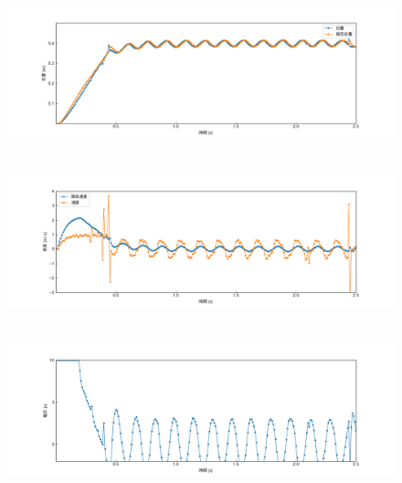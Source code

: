 \documentclass[12pt]{jsarticle}
\begin{document}
\begin{figure}[H]
  \begin{center}
    \includegraphics[clip,width=13.0cm, height=4.4cm]{../img/Exp13-1.png}
    \caption{}
    \label{Exp13-1}
  \end{center}
\end{figure}
\begin{figure}[H]
  \begin{center}
    \includegraphics[clip,width=13.0cm, height=4.4cm]{../img/Exp13-2.png}
    \caption{}
    \label{Exp13-2}
  \end{center}
\end{figure}
\begin{figure}[H]
  \begin{center}
    \includegraphics[clip,width=13.0cm, height=4.4cm]{../img/Exp13-3.png}
    \caption{}
    \label{Exp13-3}
  \end{center}
\end{figure}
\end{document}
